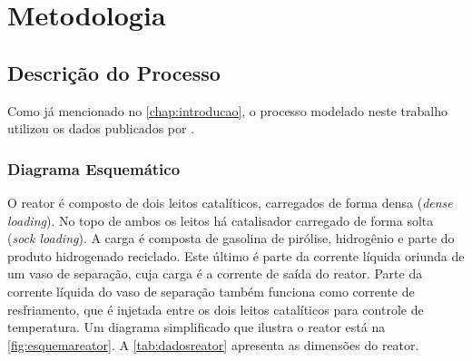 %
\chapter{Metodologia}
\label{chap:metodologia}

\section{Descrição do Processo} \label{sec:descricaoprocesso}

Como já mencionado no \autoref{chap:introducao}, o processo modelado
neste trabalho utilizou os dados publicados por . 

\subsection{Diagrama Esquemático} \label{sec:diagramaesquematico}

O reator é composto de dois leitos catalíticos, carregados de forma densa
(\emph{dense loading}). No topo de ambos os leitos há catalisador carregado de
forma solta (\emph{sock loading}). A carga é composta de gasolina de pirólise,
hidrogênio e parte do produto hidrogenado reciclado. Este último é parte da
corrente líquida oriunda de um vaso de separação, cuja carga é a corrente de
saída do reator. Parte da corrente líquida do vaso de separação também
funciona como corrente de resfriamento, que é injetada entre os dois leitos
catalíticos para controle de temperatura. Um diagrama simplificado que ilustra o
reator está na \autoref{fig:esquemareator}. A \autoref{tab:dadosreator}
apresenta as dimensões do reator.

